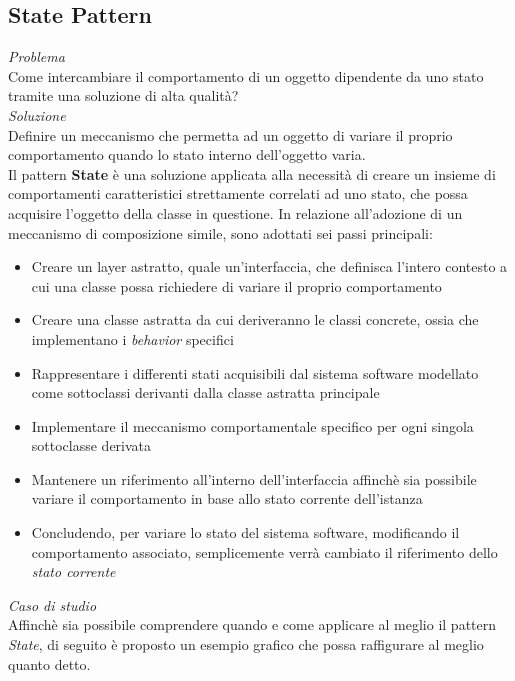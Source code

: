 \documentclass{article}
\begin{document}
\subsection*{State Pattern}
\large
\textit{Problema}\\
Come intercambiare il comportamento di un oggetto dipendente da uno stato tramite una soluzione di alta qualità?\vspace*{14pt}\\
\textit{Soluzione}\\
Definire un meccanismo che permetta ad un oggetto di variare il proprio comportamento quando lo stato interno dell'oggetto varia.\vspace*{14pt}\\
Il pattern \textbf{State} è una soluzione applicata alla necessità di creare un insieme di comportamenti caratteristici strettamente correlati ad uno stato, che possa acquisire l'oggetto della classe in questione. In relazione all'adozione di un meccanismo di composizione simile, sono adottati sei passi principali:
\begin{itemize}[label={-}]
    \itemsep0em
    \item Creare un layer astratto, quale un'interfaccia, che definisca l'intero contesto a cui una classe possa richiedere di variare il proprio comportamento
    \item Creare una classe astratta da cui deriveranno le classi concrete, ossia che implementano i \textit{behavior} specifici
    \item Rappresentare i differenti stati acquisibili dal sistema software modellato come sottoclassi derivanti dalla classe astratta principale
    \item Implementare il meccanismo comportamentale specifico per ogni singola sottoclasse derivata
    \item Mantenere un riferimento all'interno dell'interfaccia affinchè sia possibile variare il comportamento in base allo stato corrente dell'istanza
    \item Concludendo, per variare lo stato del sistema software, modificando il comportamento associato, semplicemente verrà cambiato il riferimento dello \textit{stato corrente} 
\end{itemize}\vspace*{7pt}
\textit{Caso di studio}\\
Affinchè sia possibile comprendere quando e come applicare al meglio il pattern \textit{State}, di seguito è proposto un esempio grafico che possa raffigurare al meglio quanto detto.\vspace*{7pt}
\end{document}
